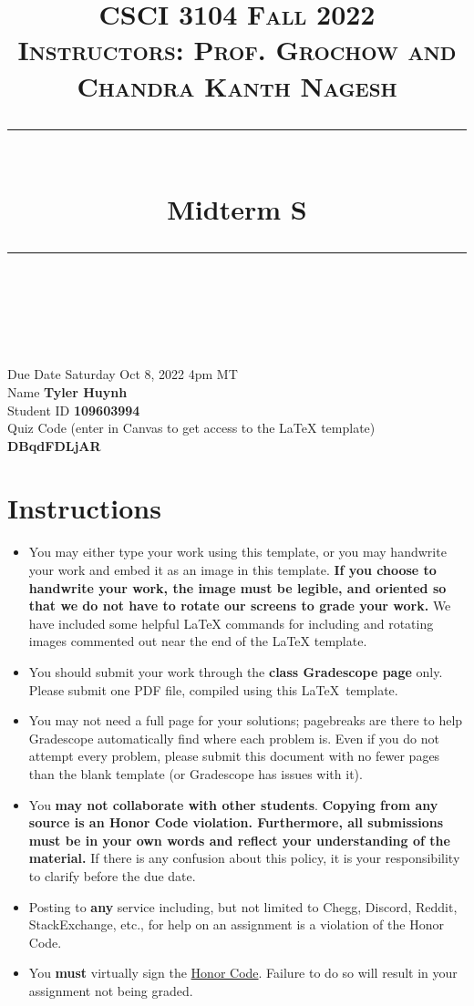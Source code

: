 \documentclass[11pt]{article}
\title{
\normalfont \normalsize 
\textsc{CSCI 3104 Fall 2022 \\ 
Instructors: Prof. Grochow and Chandra Kanth Nagesh} \\
[10pt] 
\rule{\linewidth}{0.5pt} \\[6pt] 
\huge Midterm S\standard \\
\rule{\linewidth}{2pt}  \\[10pt]
}
\date{}
\theoremstyle{definition}
\theoremstyle{definition}
\theoremstyle{definition}
\begin{document}

\maketitle


\noindent
Due Date \dotfill Saturday Oct 8, 2022 4pm MT \\
Name \dotfill \textbf{Tyler Huynh} \\
Student ID \dotfill \textbf{109603994} \\
Quiz Code (enter in Canvas to get access to the LaTeX template) \dotfill \textbf{DBqdFDLjAR}


\tableofcontents

\section*{Instructions}
 \begin{itemize}
	\item You may either type your work using this template, or you may handwrite your work and embed it as an image in this template. \textbf{If you choose to handwrite your work, the image must be legible, and oriented so that we do not have to rotate our screens to grade your work.} We have included some helpful LaTeX commands for including and rotating images commented out near the end of the LaTeX template.
	\item You should submit your work through the \textbf{class Gradescope page} only. Please submit one PDF file, compiled using this \LaTeX \ template.
	\item You may not need a full page for your solutions; pagebreaks are there to help Gradescope automatically find where each problem is. Even if you do not attempt every problem, please submit this document with no fewer pages than the blank template (or Gradescope has issues with it).

	\item You \textbf{may not collaborate with other students}. \textbf{Copying from any source is an Honor Code violation. Furthermore, all submissions must be in your own words and reflect your understanding of the material.} If there is any confusion about this policy, it is your responsibility to clarify before the due date. 

	\item Posting to \textbf{any} service including, but not limited to Chegg, Discord, Reddit, StackExchange, etc., for help on an assignment is a violation of the Honor Code.

	\item You \textbf{must} virtually sign the \hyperlink{HonorCode}{Honor Code}. Failure to do so will result in your assignment not being graded.
\end{itemize}
\end{document}
